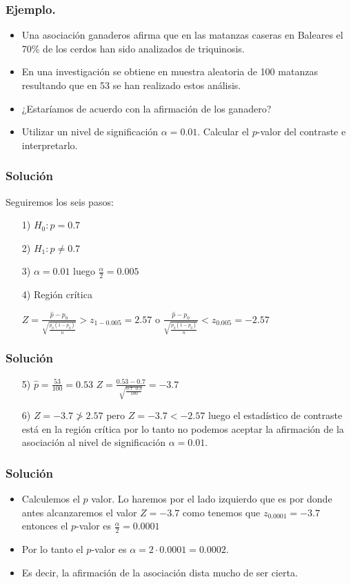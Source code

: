 \begin{frame}
       \frametitle{Ejemplo.}
\begin{itemize}
\item  Una asociación ganaderos afirma que en las matanzas caseras en Baleares el 70\% de los cerdos han sido analizados de triquinosis.
\item En una investigación se obtiene en muestra aleatoria de  100 matanzas resultando que en 53 se han realizado estos análisis.
\item ¿Estaríamos de acuerdo con la afirmación de los ganadero?
\item Utilizar un nivel de significación $\alpha=0.01$. Calcular el $p$-valor del contraste e interpretarlo.
\end{itemize}
\end{frame}
\begin{frame}       
\frametitle{Solución}
       Seguiremos los seis pasos:
\begin{itemize}
       \item[1)] $H_{0}:p=0.7$
       \item[2)] $H_{1}:p\not=0.7$
       \item[3)] $\alpha=0.01$ luego $\frac{\alpha}{2}=0.005$
       \item[4)] Región crítica

        $Z=
\frac{\hat{p}-p_{0}}{
    {\sqrt{\frac{p_{0}(1-p_{0})}{n}}}}>z_{1-0.005}=2.57$ o
        $\frac{\hat{p}-p_{0}}{
    {\sqrt{\frac{p_{0}(1-p_{0})}{n}}}}<z_{0.005}=-2.57$
\end{itemize}
\end{frame}
\begin{frame}
\frametitle{Solución}
\begin{itemize}
\item[5)] $\hat{p}=\frac{53}{100}=0.53$
    $Z=\frac{0.53-0.7}{\sqrt{\frac{0.7\cdot 0.3}{100}}}=-3.7$
\item[6)] $Z=-3.7\not>2.57$ pero $Z=-3.7<-2.57$ luego el estadístico de contraste está en la región crítica por lo tanto no podemos aceptar la 
afirmación de la asociación al nivel de significación $\alpha=0.01.$
\end{itemize}
\end{frame}

\begin{frame}
\frametitle{Solución}
\begin{itemize}
\item  Calculemos el $p$ valor. Lo haremos por el lado izquierdo que es por donde antes alcanzaremos el valor $Z=-3.7$ como tenemos que  
$z_{0.0001}=-3.7$ entonces el $p$-valor es $\frac{\alpha}{2}=0.0001$
\item Por lo tanto el $p$-valor es $\alpha=2\cdot 0.0001=0.0002$.
\item  Es decir, la afirmación de la asociación dista mucho de ser cierta.
\end{itemize}
\end{frame}

